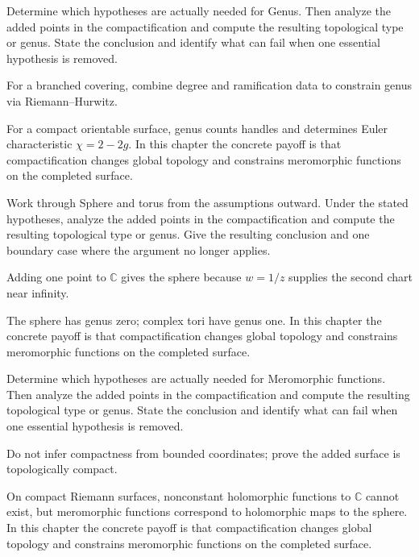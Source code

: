 \begin{exercise}\label{exr:iv26-04}
Determine which hypotheses are actually needed for Genus. Then analyze the added points in the compactification and compute the resulting topological type or genus. State the conclusion and identify what can fail when one essential hypothesis is removed.
\end{exercise}
\begin{hint}
For a branched covering, combine degree and ramification data to constrain genus via Riemann--Hurwitz.
\end{hint}
\begin{solution}
For a compact orientable surface, genus counts handles and determines Euler characteristic $\chi=2-2g$. In this chapter the concrete payoff is that compactification changes global topology and constrains meromorphic functions on the completed surface.
\end{solution}

\begin{exercise}\label{exr:iv26-05}
Work through Sphere and torus from the assumptions outward. Under the stated hypotheses, analyze the added points in the compactification and compute the resulting topological type or genus. Give the resulting conclusion and one boundary case where the argument no longer applies.
\end{exercise}
\begin{hint}
Adding one point to \(\mathbb C\) gives the sphere because \(w=1/z\) supplies the second chart near infinity.
\end{hint}
\begin{solution}
The sphere has genus zero; complex tori have genus one. In this chapter the concrete payoff is that compactification changes global topology and constrains meromorphic functions on the completed surface.
\end{solution}

\begin{exercise}\label{exr:iv26-06}
Determine which hypotheses are actually needed for Meromorphic functions. Then analyze the added points in the compactification and compute the resulting topological type or genus. State the conclusion and identify what can fail when one essential hypothesis is removed.
\end{exercise}
\begin{hint}
Do not infer compactness from bounded coordinates; prove the added surface is topologically compact.
\end{hint}
\begin{solution}
On compact Riemann surfaces, nonconstant holomorphic functions to $\mathbb C$ cannot exist, but meromorphic functions correspond to holomorphic maps to the sphere. In this chapter the concrete payoff is that compactification changes global topology and constrains meromorphic functions on the completed surface.
\end{solution}

